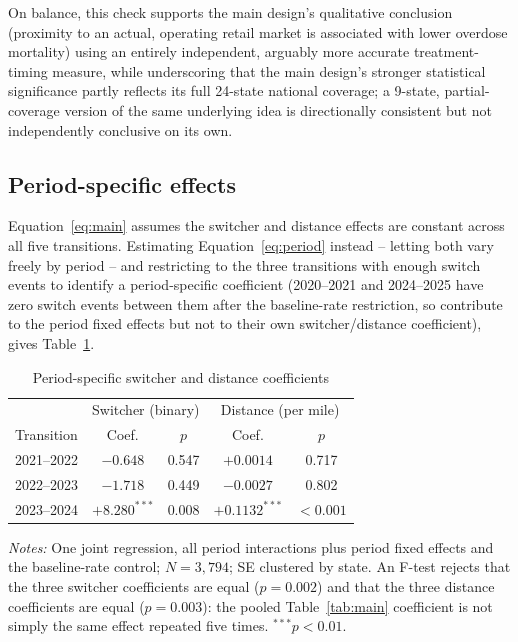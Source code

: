 \documentclass[12pt]{article}
\begin{document}
On balance, this check supports the main design's qualitative
conclusion (proximity to an actual, operating retail market is
associated with lower overdose mortality) using an entirely
independent, arguably more accurate treatment-timing measure, while
underscoring that the main design's stronger statistical significance
partly reflects its full 24-state national coverage; a 9-state,
partial-coverage version of the same underlying idea is directionally
consistent but not independently conclusive on its own.

\subsection{Period-specific effects}
\label{sec:periodeffects}

Equation~\ref{eq:main} assumes the switcher and distance effects are
constant across all five transitions. Estimating Equation~\ref{eq:period}
instead -- letting both vary freely by period -- and restricting to
the three transitions with enough switch events to identify a
period-specific coefficient (2020--2021 and 2024--2025 have zero
switch events between them after the baseline-rate restriction, so
contribute to the period fixed effects but not to their own
switcher/distance coefficient), gives Table~\ref{tab:period}.

\begin{table}[htbp]
\centering
\caption{Period-specific switcher and distance coefficients}
\label{tab:period}
\begin{tabular}{@{}lcccc@{}}
\toprule
 & \multicolumn{2}{c}{Switcher (binary)} & \multicolumn{2}{c}{Distance (per mile)} \\
Transition & Coef. & $p$ & Coef. & $p$ \\
\midrule
2021--2022 & $-0.648$ & 0.547 & $+0.0014$ & 0.717 \\
2022--2023 & $-1.718$ & 0.449 & $-0.0027$ & 0.802 \\
2023--2024 & $+8.280^{***}$ & 0.008 & $+0.1132^{***}$ & $<0.001$ \\
\bottomrule
\end{tabular}
\vspace{2pt}
\begin{minipage}{0.85\textwidth}
\footnotesize\emph{Notes:} One joint regression, all period
interactions plus period fixed effects and the baseline-rate control;
$N=3{,}794$; SE clustered by state. An F-test rejects that the three
switcher coefficients are equal ($p=0.002$) and that the three
distance coefficients are equal ($p=0.003$): the pooled
Table~\ref{tab:main} coefficient is not simply the same effect
repeated five times. $^{***}p<0.01$.
\end{minipage}
\end{table}
\end{document}
